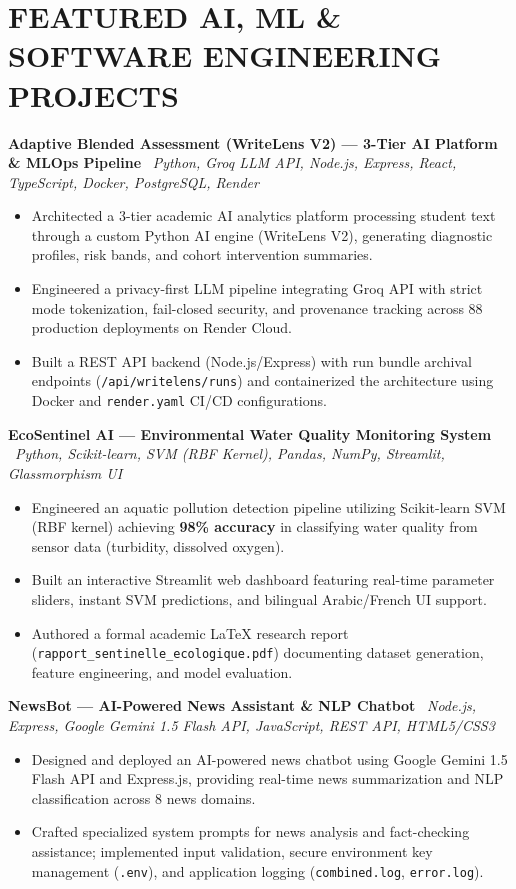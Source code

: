 \documentclass[10pt, letterpaper]{article}
\newcommand{\projectentry}[2]{%
  \noindent\textbf{#1} \textbar\ \textit{#2}\par
  \vspace{2pt}
}
\newcommand{\resumeItem}[1]{\item #1}
\begin{document}
\section{FEATURED AI, ML \& SOFTWARE ENGINEERING PROJECTS}

\projectentry{Adaptive Blended Assessment (WriteLens V2) --- 3-Tier AI Platform \& MLOps Pipeline}{Python, Groq LLM API, Node.js, Express, React, TypeScript, Docker, PostgreSQL, Render}
\begin{itemize}
  \resumeItem{Architected a 3-tier academic AI analytics platform processing student text through a custom Python AI engine (WriteLens V2), generating diagnostic profiles, risk bands, and cohort intervention summaries.}
  \resumeItem{Engineered a privacy-first LLM pipeline integrating Groq API with strict mode tokenization, fail-closed security, and provenance tracking across 88 production deployments on Render Cloud.}
  \resumeItem{Built a REST API backend (Node.js/Express) with run bundle archival endpoints (\texttt{/api/writelens/runs}) and containerized the architecture using Docker and \texttt{render.yaml} CI/CD configurations.}
\end{itemize}

\projectentry{EcoSentinel AI --- Environmental Water Quality Monitoring System}{Python, Scikit-learn, SVM (RBF Kernel), Pandas, NumPy, Streamlit, Glassmorphism UI}
\begin{itemize}
  \resumeItem{Engineered an aquatic pollution detection pipeline utilizing Scikit-learn SVM (RBF kernel) achieving \textbf{98\% accuracy} in classifying water quality from sensor data (turbidity, dissolved oxygen).}
  \resumeItem{Built an interactive Streamlit web dashboard featuring real-time parameter sliders, instant SVM predictions, and bilingual Arabic/French UI support.}
  \resumeItem{Authored a formal academic LaTeX research report (\texttt{rapport\_sentinelle\_ecologique.pdf}) documenting dataset generation, feature engineering, and model evaluation.}
\end{itemize}

\projectentry{NewsBot --- AI-Powered News Assistant \& NLP Chatbot}{Node.js, Express, Google Gemini 1.5 Flash API, JavaScript, REST API, HTML5/CSS3}
\begin{itemize}
  \resumeItem{Designed and deployed an AI-powered news chatbot using Google Gemini 1.5 Flash API and Express.js, providing real-time news summarization and NLP classification across 8 news domains.}
  \resumeItem{Crafted specialized system prompts for news analysis and fact-checking assistance; implemented input validation, secure environment key management (\texttt{.env}), and application logging (\texttt{combined.log}, \texttt{error.log}).}
\end{itemize}
\end{document}
